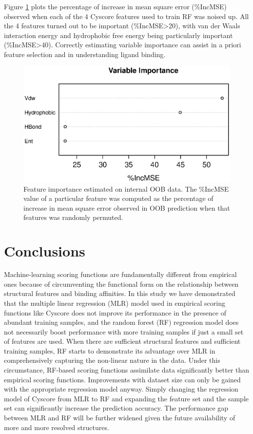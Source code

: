 \documentclass[journal=jacsat,manuscript=article]{achemso}
\begin{document}
Figure \ref{fig:varimp} plots the percentage of increase in mean square error (\%IncMSE) observed when each of the 4 Cyscore features used to train RF was noised up. All the 4 features turned out to be important (\%IncMSE\textgreater 20), with van der Waals interaction energy and hydrophobic free energy being particularly important (\%IncMSE\textgreater 40). Correctly estimating variable importance can assist in a priori feature selection and in understanding ligand binding.

\begin{figure}
\includegraphics[width=\linewidth]{../rfcyscore/x4/rf/trn-1105.eps}
\caption{Feature importance estimated on internal OOB data. The \%IncMSE value of a particular feature was computed as the percentage of increase in mean square error observed in OOB prediction when that features was randomly permuted.}
\label{fig:varimp}
\end{figure}

\section{Conclusions}

Machine-learning scoring functions are fundamentally different from empirical ones because of circumventing the functional form on the relationship between structural features and binding affinities. In this study we have demonstrated that the multiple linear regression (MLR) model used in empirical scoring functions like Cyscore does not improve its performance in the presence of abundant training samples, and the random forest (RF) regression model does not necessarily boost performance with more training samples if just a small set of features are used. When there are sufficient structural features and sufficient training samples, RF starts to demonstrate its advantage over MLR in comprehensively capturing the non-linear nature in the data. Under this circumstance, RF-based scoring functions assimilate data significantly better than empirical scoring functions. Improvements with dataset size can only be gained with the appropriate regression model anyway. Simply changing the regression model of Cyscore from MLR to RF and expanding the feature set and the sample set can significantly increase the prediction accuracy. The performance gap between MLR and RF will be further widened given the future availability of more and more resolved structures.
\end{document}
